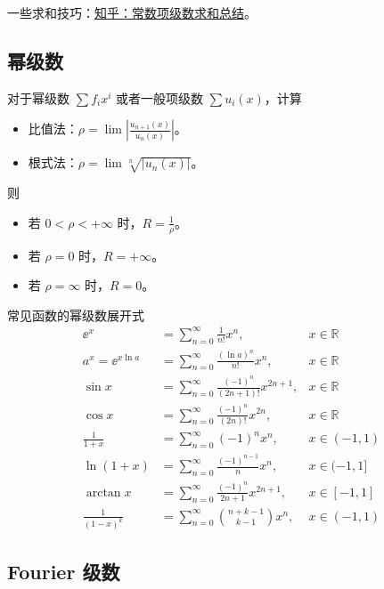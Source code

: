 一些求和技巧：\href{https://zhuanlan.zhihu.com/p/357350424}{知乎：常数项级数求和总结}。

\subsection{幂级数}


对于幂级数 $\sum f_i x^i$ 或者一般项级数 $\sum u_i(x)$，计算
\begin{itemize}
	\item 比值法：$\rho = \lim \left| \frac{u_{n+1}(x)}{u_n(x)} \right|$。
	\item 根式法：$\rho = \lim \sqrt[n]{|u_n(x)|}$。
\end{itemize}
则
\begin{itemize}
	\item 若 $0 < \rho < +\infty$ 时，$R = \frac{1}{\rho}$。
	\item 若 $\rho = 0$ 时，$R = +\infty$。
	\item 若 $\rho = \infty$ 时，$R = 0$。
\end{itemize}

常见函数的幂级数展开式
\[ \begin{aligned}
		\ee^x              & = \sum_{n=0}^\infty \frac{1}{n!} x^n,                & x \in \mathbb{R} \\
		a^x = \ee^{x\ln a} & = \sum_{n=0}^\infty \frac{(\ln a)^n}{n!} x^n,        & x \in \mathbb{R} \\
		\sin x             & = \sum_{n=0}^\infty \frac{(-1)^n}{(2n+1)!} x^{2n+1}, & x \in \mathbb{R} \\
		\cos x             & = \sum_{n=0}^\infty \frac{(-1)^n}{(2n)!} x^{2n},     & x \in \mathbb{R} \\
		\frac{1}{1+x}      & = \sum_{n=0}^\infty (-1)^n x^{n},                    & x \in (-1, 1)    \\
		\ln(1+x)           & = \sum_{n=0}^\infty \frac{(-1)^{n-1}}{n} x^{n},      & x \in (-1, 1]    \\
		\arctan x          & = \sum_{n=0}^\infty \frac{(-1)^{n}}{2n+1} x^{2n+1},  & x \in [-1, 1]    \\
		\frac{1}{(1-x)^k}  & = \sum_{n=0}^{\infty} \binom{n+k-1}{k-1} x^n,        & x \in (-1,1)
	\end{aligned} \]

\subsection{Fourier 级数}


